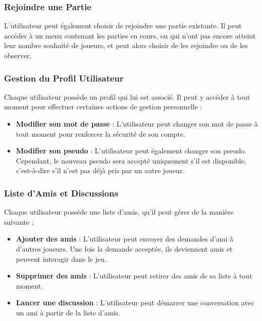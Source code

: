 \documentclass{report}
\begin{document}
\subsubsection{Rejoindre une Partie}

\noindent L'utilisateur peut également choisir de rejoindre une partie existante. Il peut accéder à un menu contenant les parties en cours, ou qui n'ont pas encore atteint leur nombre souhaité de joueurs, et peut alors choisir de les rejoindre ou de les observer.

\subsubsection{Gestion du Profil Utilisateur}

\noindent Chaque utilisateur possède un profil qui lui est associé. Il peut y accéder à tout moment pour effectuer certaines actions de gestion personnelle :
\begin{itemize}
    \item \textbf{Modifier son mot de passe} : L'utilisateur peut changer son mot de passe à tout moment pour renforcer la sécurité de son compte.
    \item \textbf{Modifier son pseudo} : L'utilisateur peut également changer son pseudo. Cependant, le nouveau pseudo sera accepté uniquement s'il est disponible, c'est-à-dire s'il n'est pas déjà pris par un autre joueur.
\end{itemize}

\subsubsection{Liste d'Amis et Discussions}

\noindent Chaque utilisateur possède une liste d'amis, qu'il peut gérer de la manière suivante :

\begin{itemize}
    \item \textbf{Ajouter des amis} : L'utilisateur peut envoyer des demandes d'ami à d'autres joueurs. Une fois la demande acceptée, ils deviennent amis et peuvent interagir dans le jeu.
    \item \textbf{Supprimer des amis} : L'utilisateur peut retirer des amis de sa liste à tout moment.
    \item \textbf{Lancer une discussion} : L'utilisateur peut démarrer une conversation avec un ami à partir de la liste d'amis.
\end{itemize}
\end{document}
